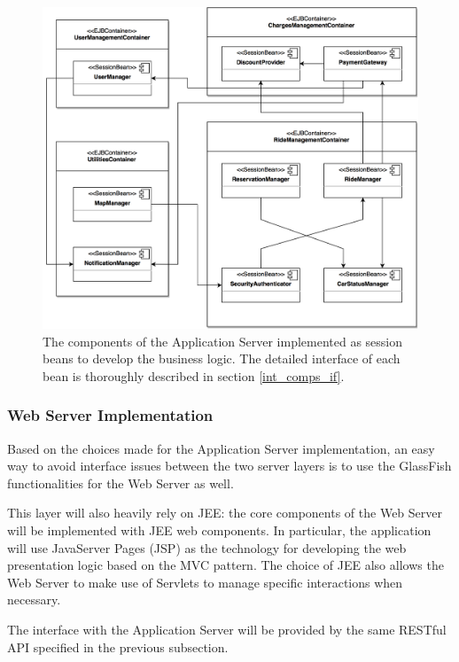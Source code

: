\begin{figure}[H]
\begin{center}
		\includegraphics[width=\textwidth]{./arch_design/diagrams/app_server_comps.png}
		\caption{The components of the Application Server implemented as session beans to develop the business logic. The detailed interface of each bean is thoroughly described in section \ref{int_comps_if}.}
		\label{app_server_comps}
\end{center}
\end{figure}

\subsubsection{Web Server Implementation}
Based on the choices made for the Application Server implementation, an easy way to avoid interface issues between the two server layers is to use the GlassFish functionalities for the Web Server as well.

This layer will also heavily rely on JEE: the core components of the Web Server will be implemented with JEE web components. In particular, the application will use JavaServer Pages (JSP) as the technology for developing the web presentation logic based on the MVC pattern. The choice of JEE also allows the Web Server to make use of Servlets to manage specific interactions when necessary.

The interface with the Application Server will be provided by the same RESTful API specified in the previous subsection.

